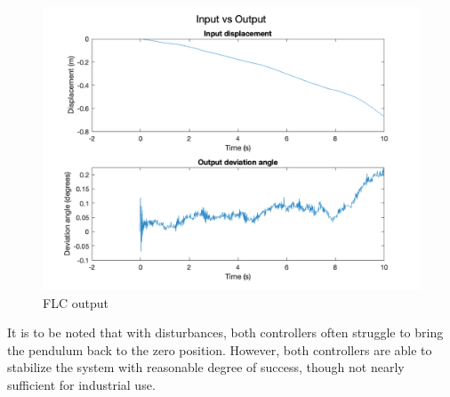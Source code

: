\begin{figure}[h!]
    \centering
    \includegraphics[scale=0.35]{images/FLC.png}
    \caption{ FLC output }
    \label{fig:FLC}
\end{figure}

It is to be noted that with disturbances, both controllers often struggle to bring the pendulum back to the zero position. However, both controllers are able to stabilize the system with reasonable degree of success, though not nearly sufficient for industrial use.


